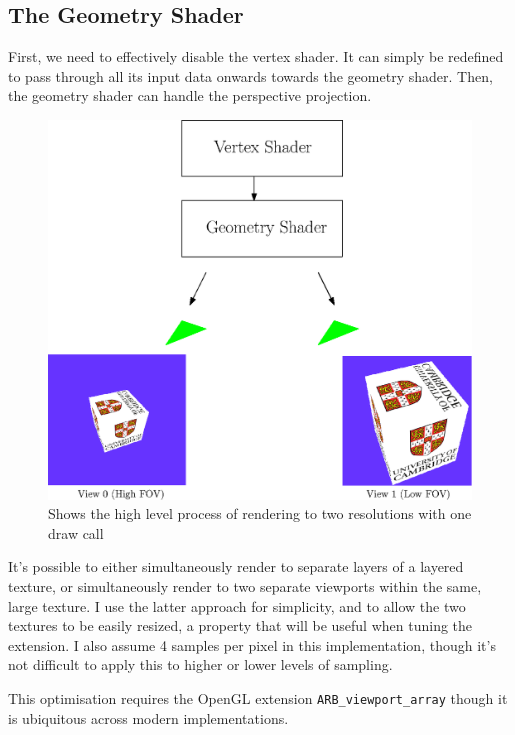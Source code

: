 \documentclass[12pt,a4paper,twoside,openright]{report}
\begin{document}
\subsection{The Geometry Shader}

First, we need to effectively disable the vertex shader. It can simply be redefined to pass through all its input data onwards towards the geometry shader.
Then, the geometry shader can handle the perspective projection.

\begin{figure}[tbh]
\centerline{\includegraphics[scale=0.6]{figs/geoshader.eps}}
\caption{Shows the high level process of rendering to two resolutions with one draw call}
\label{epsfig1}
\end{figure}

It's possible to either simultaneously render to separate layers of a layered texture, or simultaneously render to two separate viewports within the same, large texture. I use the latter approach for simplicity, and to allow the two textures to be easily resized, a property that will be useful when tuning the extension. I also assume 4 samples per pixel in this implementation, though it's not difficult to apply this to higher or lower levels of sampling. 

This optimisation requires the OpenGL extension \texttt{ARB\_viewport\_array} \cite{arbViewport} though it is ubiquitous across modern implementations.
\end{document}
